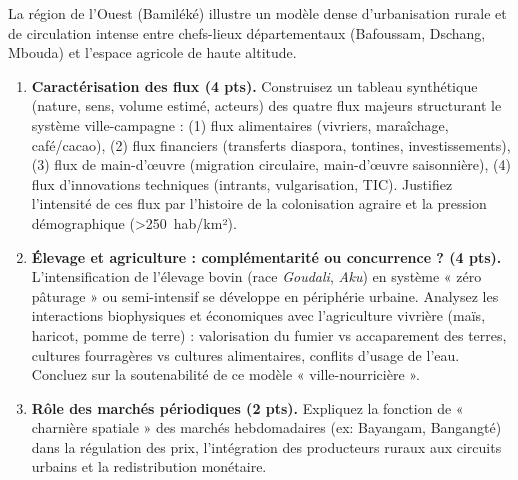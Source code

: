 \documentclass[11pt]{article}
\begin{document}
\begin{exercice}
\label{exo:ouest}
La région de l'Ouest (Bamiléké) illustre un modèle dense d'urbanisation rurale et de circulation intense entre chefs-lieux départementaux (Bafoussam, Dschang, Mbouda) et l'espace agricole de haute altitude.
\begin{enumerate}
    \item \textbf{Caractérisation des flux (4 pts).} Construisez un tableau synthétique (nature, sens, volume estimé, acteurs) des quatre flux majeurs structurant le système ville-campagne : (1) flux alimentaires (vivriers, maraîchage, café/cacao), (2) flux financiers (transferts diaspora, tontines, investissements), (3) flux de main-d'œuvre (migration circulaire, main-d'œuvre saisonnière), (4) flux d'innovations techniques (intrants, vulgarisation, TIC). Justifiez l'intensité de ces flux par l'histoire de la colonisation agraire et la pression démographique (\SI{>250}{hab/km²}).
    \item \textbf{Élevage et agriculture : complémentarité ou concurrence ? (4 pts).} L'intensification de l'élevage bovin (race \textit{Goudali}, \textit{Aku}) en système « zéro pâturage » ou semi-intensif se développe en périphérie urbaine. Analysez les interactions biophysiques et économiques avec l'agriculture vivrière (maïs, haricot, pomme de terre) : valorisation du fumier vs accaparement des terres, cultures fourragères vs cultures alimentaires, conflits d'usage de l'eau. Concluez sur la soutenabilité de ce modèle « ville-nourricière ».
    \item \textbf{Rôle des marchés périodiques (2 pts).} Expliquez la fonction de « charnière spatiale » des marchés hebdomadaires (ex: Bayangam, Bangangté) dans la régulation des prix, l'intégration des producteurs ruraux aux circuits urbains et la redistribution monétaire.
\end{enumerate}
\end{exercice}
\end{document}
